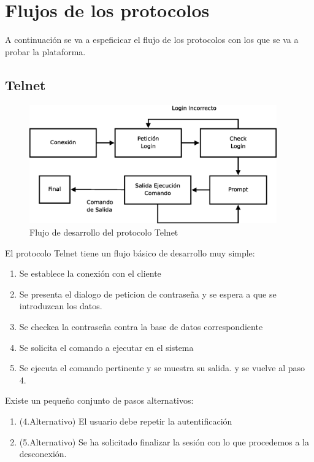 \documentclass[a4paper,spanish,12pt]{book}
\begin{document}
\section{Flujos de los protocolos}
A continuación se va a espeficicar el flujo de los protocolos con los que se va a probar la plataforma.

\subsection{Telnet}
\begin{figure}[h]
	\includegraphics[width=0.95\textwidth]{img/DiagramaFlujoTelnet.eps}
              \caption{Flujo de desarrollo del protocolo Telnet}
  \label{fig:DiagramaFlujoTelnet}
\end{figure}

El protocolo Telnet tiene un flujo básico de desarrollo muy simple:
\begin{enumerate}
	\item Se establece la conexión con el cliente
	\item Se presenta el dialogo de peticion de contraseña y se espera a que se introduzcan los datos.
	\item Se checkea la contraseña contra la base de datos correspondiente
	\item Se solicita el comando a ejecutar en el sistema
	\item Se ejecuta el comando pertinente y se muestra su salida. y se vuelve al paso 4.
\end{enumerate}
Existe un pequeño conjunto de pasos alternativos:
\begin{enumerate}
	\item (4.Alternativo) El usuario debe repetir la autentificación
	\item (5.Alternativo) Se ha solicitado finalizar la sesión con lo que procedemos a la desconexión.
\end{enumerate}
\end{document}
